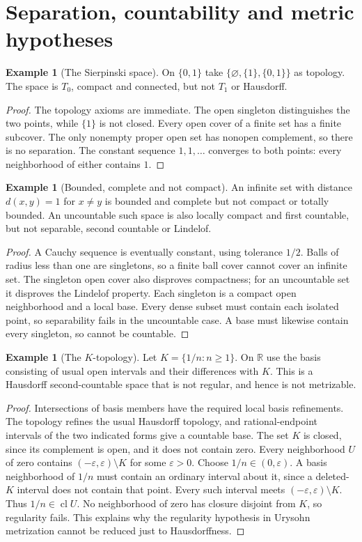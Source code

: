 \documentclass[11pt,oneside,openany]{book}
\theoremstyle{definition}
\newtheorem{example}[theorem]{Example}
\theoremstyle{remark}
\newcommand{\R}{\mathbb R}\newcommand{\C}{\mathbb C}
\newcommand{\eps}{\varepsilon}
\DeclareMathOperator{\cl}{cl}
\begin{document}
\section{Separation, countability and metric hypotheses}
\begin{example}[The Sierpinski space]\label{d10:18:sierpinski}
On $\{0,1\}$ take $\{\varnothing,\{1\},\{0,1\}\}$ as topology.
The space is $T_0$, compact and connected, but not $T_1$ or Hausdorff.
\end{example}
\begin{proof}
The topology axioms are immediate. The open singleton distinguishes
the two points, while $\{1\}$ is not closed. Every open cover of a
finite set has a finite subcover. The only nonempty proper open
set has nonopen complement, so there is no separation.
The constant sequence $1,1,\ldots$ converges to both points:
every neighborhood of either contains $1$.
\end{proof}

\begin{example}[Bounded, complete and not compact]\label{d10:18:discrete}
An infinite set with distance $d(x,y)=1$ for $x\ne y$ is bounded
and complete but not compact or totally bounded. An uncountable
such space is also locally compact and first countable, but not
separable, second countable or Lindelof.
\end{example}
\begin{proof}
A Cauchy sequence is eventually constant, using tolerance $1/2$.
Balls of radius less than one are singletons, so a finite ball cover
cannot cover an infinite set. The singleton open cover also disproves
compactness; for an uncountable set it disproves the Lindelof property.
Each singleton is a compact open neighborhood and a local base.
Every dense subset must contain each isolated point, so separability
fails in the uncountable case. A base must likewise contain every
singleton, so cannot be countable.
\end{proof}

\begin{example}[The $K$-topology]\label{d10:18:k-topology}
Let $K=\{1/n:n\geq1\}$. On $\R$ use the basis consisting of usual
open intervals and their differences with $K$.
This is a Hausdorff second-countable space that is not regular,
and hence is not metrizable.
\end{example}
\begin{proof}
Intersections of basis members have the required local basis
refinements. The topology refines the usual Hausdorff topology,
and rational-endpoint intervals of the two indicated forms give
a countable base. The set $K$ is closed, since its complement is
open, and it does not contain zero.
Every neighborhood $U$ of zero contains
$(-\eps,\eps)\setminus K$ for some $\eps>0$.
Choose $1/n\in(0,\eps)$. A basis neighborhood of $1/n$ must contain
an ordinary interval about it, since a deleted-$K$ interval does
not contain that point. Every such interval meets
$(-\eps,\eps)\setminus K$. Thus $1/n\in\cl U$.
No neighborhood of zero has closure disjoint from $K$, so
regularity fails. This explains why the regularity hypothesis in
Urysohn metrization cannot be reduced just to Hausdorffness.
\end{proof}
\end{document}
